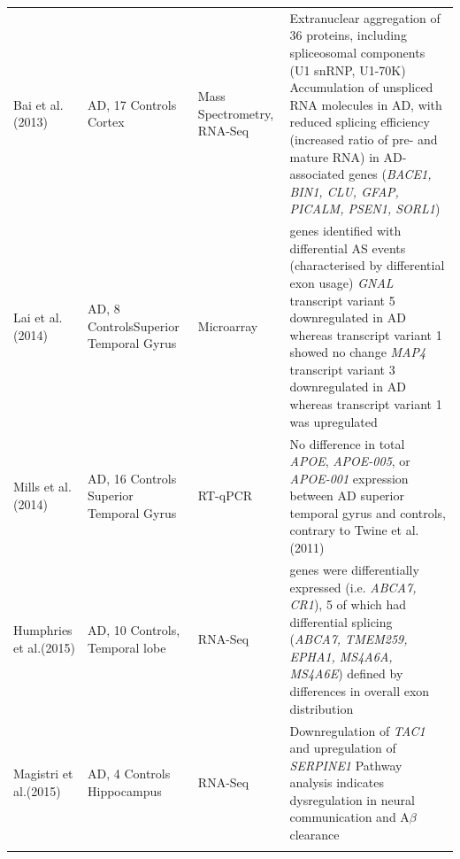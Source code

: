 \begin{landscape}
\begin{longtable}[c]{p{3cm}p{4cm}p{3cm}p{16cm}}
		\centering Bai et al. \newline(2013)\cite{Bai2013} &
		\centering 18 AD, 17 Controls \newline Cortex &
		\centering Mass Spectrometry, RNA-Seq &
		\tabitem Extranuclear aggregation of 36 proteins, including spliceosomal components (U1 snRNP, U1-70K) \newline
		\tabitem Accumulation of unspliced RNA molecules in AD, with reduced splicing efficiency (increased ratio of pre- and mature RNA) in AD-associated genes (\textit{BACE1, BIN1, CLU, GFAP, PICALM, PSEN1, SORL1})  \\
		\hdashline[0.5pt/5pt]
		
		\centering  Lai et al. \newline(2014)\cite{Lai2014} &
		\centering 8 AD, 8 Controls\newline Superior Temporal Gyrus &
		\centering Microarray &
		\tabitem 22 genes identified with differential AS events (characterised by differential exon usage) \newline  
		\tabitem \textit{GNAL} transcript variant 5 downregulated in AD whereas transcript variant 1 showed no change \newline 
		\tabitem \textit{MAP4} transcript variant 3 downregulated in AD whereas transcript variant 1 was upregulated\\
		\hdashline[0.5pt/5pt]
		
		\centering Mills et al. (2014)\cite{Mills2014} &
		\centering 14 AD, 16 Controls \newline Superior Temporal Gyrus &
		\centering RT-qPCR &
		\tabitem No difference in total \textit{APOE}, \textit{APOE-005}, or \textit{APOE-001} expression between AD superior temporal gyrus and controls, contrary to Twine et al. (2011)\cite{Twine2011} \\
		
		\centering Humphries et al.(2015)\cite{Humphries2015} &
		\centering 10 AD, 10 Controls, \newline Temporal lobe &
		\centering RNA-Seq &
		\tabitem 9 genes were differentially expressed (i.e. \textit{ABCA7, CR1}), 5 of which had differential splicing (\textit{ABCA7, TMEM259, EPHA1, MS4A6A, MS4A6E}) defined by differences in overall exon distribution \\
		
		\centering Magistri et al.(2015)\cite{Magistri2015} &
		\centering 4 AD, 4 Controls \newline Hippocampus &
		\centering RNA-Seq &
		\tabitem Downregulation of \textit{TAC1} and upregulation of \textit{SERPINE1} \newline 
		\tabitem Pathway analysis indicates dysregulation in neural communication and A$\beta$ clearance \\		
		\hdashline[0.5pt/5pt]
		

\end{longtable}
\end{landscape}
